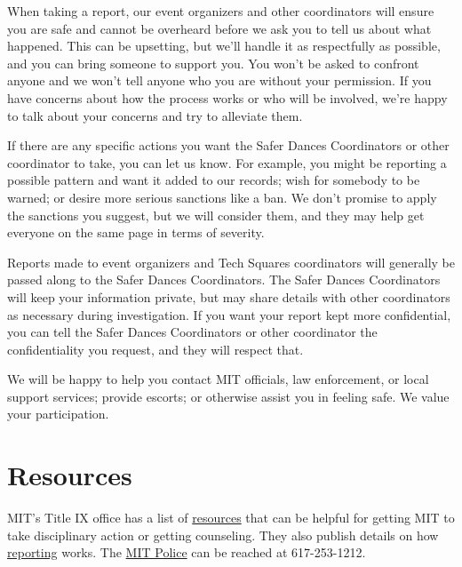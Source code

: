 \documentclass{article}
\begin{document}
When taking a report, our event organizers and other coordinators will ensure you are safe and cannot be overheard before we ask you to tell us about what happened. This can be upsetting, but we'll handle it as respectfully as possible, and you can bring someone to support you. You won't be asked to confront anyone and we won't tell anyone who you are without your permission. If you have concerns about how the process works or who will be involved, we're happy to talk about your concerns and try to alleviate them.

If there are any specific actions you want the Safer Dances Coordinators or other coordinator to take, you can let us know. For example, you might be reporting a possible pattern and want it added to our records; wish for somebody to be warned; or desire more serious sanctions like a ban. We don't promise to apply the sanctions you suggest, but we will consider them, and they may help get everyone on the same page in terms of severity.

Reports made to event organizers and Tech Squares coordinators will generally be passed along to the Safer Dances Coordinators. The Safer Dances Coordinators will keep your information private, but may share details with other coordinators as necessary during investigation. If you want your report kept more confidential, you can tell the Safer Dances Coordinators or other coordinator the confidentiality you request, and they will respect that.

We will be happy to help you contact MIT officials, law enforcement, or local support services; provide escorts; or otherwise assist you in feeling safe. We value your participation.

\section{Resources}
\label{sec:resources}

MIT's Title IX office has a list of \href{http://titleix.mit.edu/resources}{resources} that can be helpful for getting MIT to take disciplinary action or getting counseling. They also publish details on how \href{http://titleix.mit.edu/reporting}{reporting} works. The \href{http://police.mit.edu/report-crime-or-accident}{MIT Police} can be reached at 617-253-1212.
\end{document}
